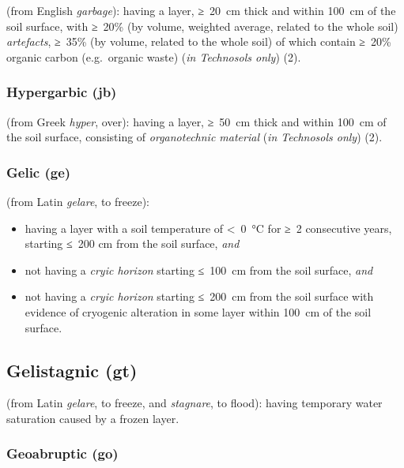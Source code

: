 \documentclass[
  letterpaper,
  DIV=11,
  numbers=noendperiod]{scrreprt}
\providecommand{\tightlist}{%
  \setlength{\itemsep}{0pt}\setlength{\parskip}{0pt}}\usepackage{longtable,booktabs,array}
\begin{document}
(from English \emph{garbage}): having a layer, ≥~20~cm thick and within
100~cm of the soil surface, with ≥~20\% (by volume, weighted average,
related to the whole soil) \emph{artefacts}, ≥~35\% (by volume, related
to the whole soil) of which contain ≥~20\% organic carbon (e.g.~organic
waste) (\emph{in Technosols only}) (2).

\hypertarget{hypergarbic-jb}{%
\subsubsection{Hypergarbic (jb)}\label{hypergarbic-jb}}

(from Greek \emph{hyper}, over): having a layer, ≥~50~cm thick and
within 100~cm of the soil surface, consisting of \emph{organotechnic
material} (\emph{in Technosols only}) (2).

\hypertarget{gelic-ge}{%
\subsubsection{Gelic (ge)}\label{gelic-ge}}

(from Latin \emph{gelare}, to freeze):

\begin{itemize}
\tightlist
\item
  having a layer with a soil temperature of \textless~0~°C for ≥~2
  consecutive years, starting ≤~200 cm from the soil surface, \emph{and}
\item
  not having a \emph{cryic horizon} starting ≤~100~cm from the soil
  surface, \emph{and}
\item
  not having a \emph{cryic horizon} starting ≤~200~cm from the soil
  surface with evidence of cryogenic alteration in some layer within
  100~cm of the soil surface.
\end{itemize}

\hypertarget{gelistagnic-gt}{%
\subsection{Gelistagnic (gt)}\label{gelistagnic-gt}}

(from Latin \emph{gelare}, to freeze, and \emph{stagnare}, to flood):
having temporary water saturation caused by a frozen layer.

\hypertarget{geoabruptic-go-1}{%
\subsubsection{Geoabruptic (go)}\label{geoabruptic-go-1}}
\end{document}
